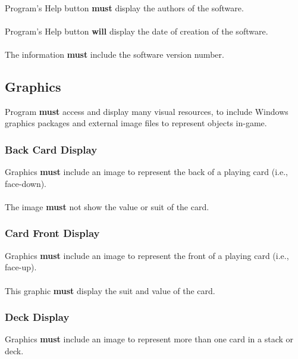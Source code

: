 \documentclass{article}
\begin{document}
\paragraph{}Program’s Help button \textbf{must} display the authors of the software.
\paragraph{}Program’s Help button \textbf{will} display the date of creation of the software.
\paragraph{}The information \textbf{must} include the software version number. %

\subsection{Graphics}Program \textbf{must} access and display many visual resources, to include Windows graphics packages and external image files to represent objects in-game.


\subsubsection{Back Card Display}Graphics \textbf{must} include an image to represent the back of a playing card (i.e., face-down).  
\paragraph{}The image \textbf{must} not show the value or suit of the card.  


\subsubsection{Card Front Display}Graphics \textbf{must} include an image to represent the front of a playing card (i.e., face-up).  
\paragraph{}This graphic \textbf{must} display the suit and value of the card.


\subsubsection{Deck Display}Graphics \textbf{must} include an image to represent more than one card in a stack or deck.  
\end{document}
